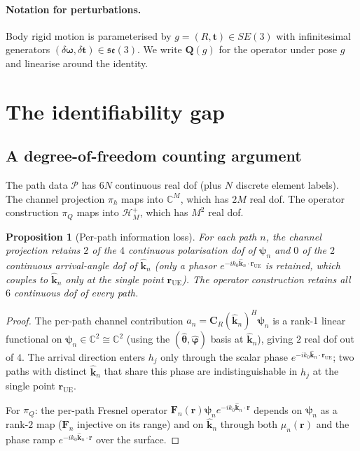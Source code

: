 \documentclass[11pt,a4paper]{article}
\newtheorem{proposition}[theorem]{Proposition}
\theoremstyle{definition}
\newcommand{\rr}{\mathbf{r}}
\newcommand{\kh}{\hat{\mathbf{k}}}
\newcommand{\Q}{\mathbf{Q}}
\newcommand{\F}{\mathbf{F}}
\newcommand{\Cp}{\mathbf{C}}
\newcommand{\psib}{\boldsymbol{\psi}}
\newcommand{\C}{\mathbb{C}}
\begin{document}
\paragraph{Notation for perturbations.}
Body rigid motion is parameterised by $g=(R,\mathbf{t})\in SE(3)$ with
infinitesimal generators $(\delta\boldsymbol{\omega},\delta\mathbf{t})\in
\mathfrak{se}(3)$. We write $\Q(g)$ for the operator under pose $g$ and
linearise around the identity.

\section{The identifiability gap}
\label{sec:identifiability}

\subsection{A degree-of-freedom counting argument}

The path data $\mathcal{P}$ has $6N$ continuous real dof
(plus $N$ discrete element labels). The channel projection $\pi_h$
maps into $\C^M$, which has $2M$ real dof. The operator construction
$\pi_Q$ maps into $\mathcal{H}_M^+$, which has $M^2$ real dof.

\begin{proposition}[Per-path information loss]
\label{prop:per-path-loss}
For each path $n$, the channel projection retains
$2$ of the $4$ continuous polarisation dof of $\psib_n$ and $0$ of
the $2$ continuous arrival-angle dof of $\kh_n$ (only a phasor
$e^{-ik_0\kh_n\cdot\rr_{\mathrm{UE}}}$ is retained, which couples to
$\kh_n$ only at the single point $\rr_{\mathrm{UE}}$). The operator
construction retains all $6$ continuous dof of every path.
\end{proposition}

\begin{proof}
The per-path channel contribution
$a_n = \Cp_R(\kh_n)^H\psib_n$ is a rank-$1$ linear functional on
$\psib_n\in\C^2 \cong \C^2$ (using the
$(\hat{\boldsymbol{\theta}},\hat{\boldsymbol{\varphi}})$ basis at $\kh_n$),
giving $2$ real dof out of $4$. The arrival direction enters $h_j$ only
through the scalar phase $e^{-ik_0\kh_n\cdot\rr_{\mathrm{UE}}}$;
two paths with distinct $\kh_n$ that share this phase are
indistinguishable in $h_j$ at the single point $\rr_{\mathrm{UE}}$.

For $\pi_Q$: the per-path Fresnel operator
$\F_n(\rr)\psib_n e^{-ik_0\kh_n\cdot\rr}$ depends on $\psib_n$ as a
rank-$2$ map ($\F_n$ injective on its range)
and on $\kh_n$ through both $\mu_n(\rr)$ and the phase ramp
$e^{-ik_0\kh_n\cdot\rr}$ over the surface.
\end{proof}
\end{document}

